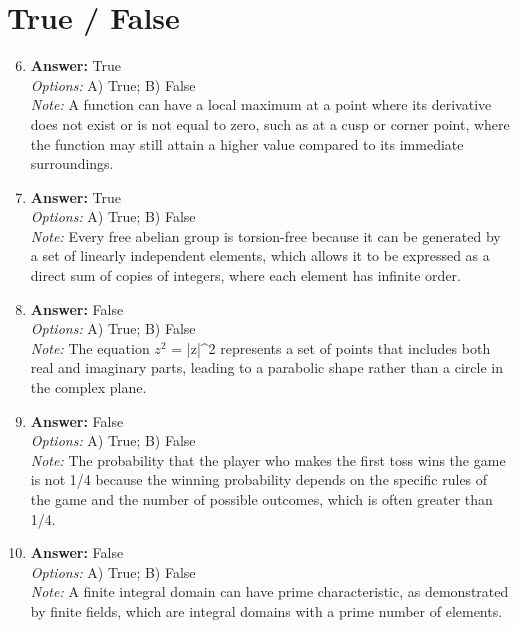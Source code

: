 \documentclass[12pt]{article}
\begin{document}
\section*{True / False}
\begin{enumerate}[label=\arabic*.]
\setcounter{enumi}{5}
\item \textbf{Answer:} True
\\ \textit{Options:} A) True; B) False
\\ \textit{Note:} A function can have a local maximum at a point where its derivative does not exist or is not equal to zero, such as at a cusp or corner point, where the function may still attain a higher value compared to its immediate surroundings.
\item \textbf{Answer:} True
\\ \textit{Options:} A) True; B) False
\\ \textit{Note:} Every free abelian group is torsion-free because it can be generated by a set of linearly independent elements, which allows it to be expressed as a direct sum of copies of integers, where each element has infinite order.
\item \textbf{Answer:} False
\\ \textit{Options:} A) True; B) False
\\ \textit{Note:} The equation $z^2$ = |z|^2 represents a set of points that includes both real and imaginary parts, leading to a parabolic shape rather than a circle in the complex plane.
\item \textbf{Answer:} False
\\ \textit{Options:} A) True; B) False
\\ \textit{Note:} The probability that the player who makes the first toss wins the game is not 1/4 because the winning probability depends on the specific rules of the game and the number of possible outcomes, which is often greater than 1/4.
\item \textbf{Answer:} False
\\ \textit{Options:} A) True; B) False
\\ \textit{Note:} A finite integral domain can have prime characteristic, as demonstrated by finite fields, which are integral domains with a prime number of elements.
\end{enumerate}
\end{document}
